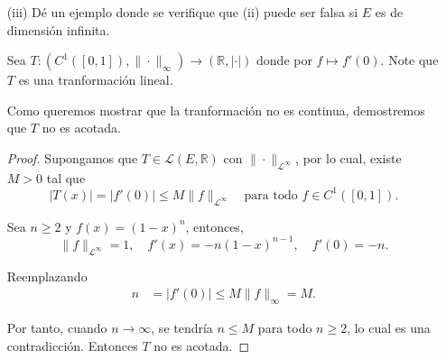 \begin{enumerate}
\begin{proof}
    Como $E$ es un espacio vectorial de dimensión finita, tomemos la base de $E$ como $\mathcal{B}=\{v_1,v_2,\dots, v_n\}$, luego si $x\in E$ tenemos que $x=\displaystyle\sum_{i=1}^{n}x_iv_i$, entonces la transformación lineal T es de la forma,
      \begin{align*}
           Tx&=T\left( \displaystyle\sum_{i=1}^{n} x_i v_i\right) \\
           &=\displaystyle\sum_{i=1}^{n} x_i T(v_i),\\
           &=\displaystyle\sum_{i=1}^{n} x_i v_i \max_{\substack{1\leq i\leq n}} T(v_i),
        \end{align*} 
    luego, tenemos que
    \begin{align*}
\|T\|_E 
&= \left\|\sum_{i=1}^{n} x_i T(v_i)\right\|_E\\
&\leq \sum_{i=1}^{n} \left\|x_i T(v_i)\right\|_E\\
&= \sum_{i=1}^{n} |x_i| \cdot \|T(v_i)\|_E,
\end{align*}
 por el punto anterior, como $E$ es un espacio de dimensión finita existen constantes positivas $C_1$ y $C_2$, tal que $C_1\|x\|_E\leq\|x\|_1\leq C_2\|x\|_E$ y si tomamos a $M_1=\max_{\substack{1\leq i\leq n}} \|T(v_i)\|_E$, entonces,
 \begin{align*}
     \sum_{i=1}^{n} |x_i| \cdot \|T(v_i)\|_E&= \|x\|_1 \max_{\substack{1\leq i \leq n}} \|T(v_i)\|_E,\\
     &\leq M_1 C_2\|x\|_E\\
     &=M \|x\|_E,
 \end{align*}
 por lo cual, T es acotado y continuo.
    \end{proof}
    \item[(iii)] Dé un ejemplo donde se verifique que (ii) puede ser falsa si $E$ es de dimensión infinita.
    \begin{sol}
    Sea $
T: (C^1([0,1]), \|\cdot\|_{\infty}) \longrightarrow (\mathbb{R}, |\cdot|)
$
donde por $f \mapsto f'(0)$. Note que $T$ es una tranformación lineal.

Como queremos mostrar que la tranformación no es continua, demostremos que $T$ no es acotada.
\begin{proof}

Supongamos que $T \in \mathcal{L}(E, \mathbb{R})$ con $\|\cdot\|_{\mathcal{L}^\infty}$, por lo cual,  existe $M > 0$ tal que 
$$
|T(x)| = |f'(0)| \leq M \|f\|_{\mathcal{L}^\infty }\quad \text{para todo } f \in C^1([0,1]).
$$

Sea $n \geq 2$ y $f(x) = (1 - x)^n$, entonces,
$$
\|f\|_{\mathcal{L}^\infty} = 1, \quad f'(x) = -n(1 - x)^{n - 1}, \quad f'(0) = -n.
$$

Reemplazando
\begin{align*}
n &= |f'(0)| \leq M \|f\|_\infty = M.
\end{align*}

Por tanto, cuando $n \to \infty$, se tendría $n \leq M$ para todo $n \geq 2$, lo cual es una contradicción. Entonces $T$ no es acotada.

\end{proof}
        
    \end{sol}
\end{enumerate}


